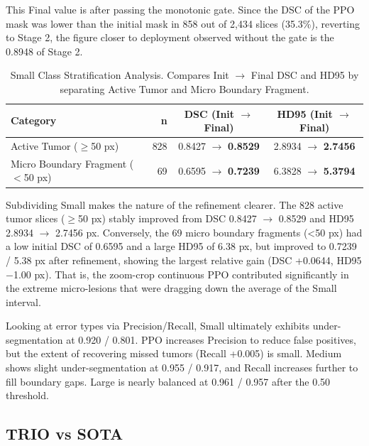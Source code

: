 \documentclass[11pt,a4paper]{article}
\begin{document}
This Final value is after passing the monotonic gate. Since the DSC of the PPO mask was lower than the initial mask in 858 out of 2,434 slices (35.3\%), reverting to Stage 2, the figure closer to deployment observed without the gate is the 0.8948 of Stage 2.

\begin{table}[htbp]
    \centering
    \caption{Small Class Stratification Analysis. Compares Init $\rightarrow$ Final DSC and HD95 by separating Active Tumor and Micro Boundary Fragment.}
    \begin{tabular}{lrcc}
        \toprule
        Category & n & DSC (Init $\rightarrow$ Final) & HD95 (Init $\rightarrow$ Final) \\
        \midrule
        Active Tumor ($\ge$50 px) & 828 & 0.8427 $\rightarrow$ \textbf{0.8529} & 2.8934 $\rightarrow$ \textbf{2.7456} \\
        Micro Boundary Fragment ($<$50 px) & 69 & 0.6595 $\rightarrow$ \textbf{0.7239} & 6.3828 $\rightarrow$ \textbf{5.3794} \\
        \bottomrule
    \end{tabular}
    \label{tab:small_strata}
\end{table}

Subdividing Small makes the nature of the refinement clearer. The 828 active tumor slices ($\ge$50 px) stably improved from DSC 0.8427 $\rightarrow$ 0.8529 and HD95 2.8934 $\rightarrow$ 2.7456 px. Conversely, the 69 micro boundary fragments (<50 px) had a low initial DSC of 0.6595 and a large HD95 of 6.38 px, but improved to 0.7239 / 5.38 px after refinement, showing the largest relative gain (DSC +0.0644, HD95 $-$1.00 px). That is, the zoom-crop continuous PPO contributed significantly in the extreme micro-lesions that were dragging down the average of the Small interval.

Looking at error types via Precision/Recall, Small ultimately exhibits under-segmentation at 0.920 / 0.801. PPO increases Precision to reduce false positives, but the extent of recovering missed tumors (Recall +0.005) is small. Medium shows slight under-segmentation at 0.955 / 0.917, and Recall increases further to fill boundary gaps. Large is nearly balanced at 0.961 / 0.957 after the 0.50 threshold.

\subsection{TRIO vs SOTA}
\end{document}
